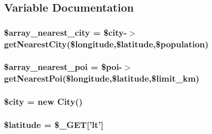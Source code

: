 \subsection{Variable Documentation}
\hypertarget{poi_2nearest_8php_ad20bfb1568497d36431fbd90847417cc}{
\subsubsection[{\$array\-\_\-nearest\-\_\-city}]{\setlength{\rightskip}{0pt plus 5cm}\$array\-\_\-nearest\-\_\-city = \$city-\/$>$get\-Nearest\-City(\$longitude,\$latitude,\$population)}}\label{poi_2nearest_8php_ad20bfb1568497d36431fbd90847417cc}
\hypertarget{poi_2nearest_8php_a0919b64d32b8806e2d59272d197f32e7}{
\subsubsection[{\$array\-\_\-nearest\-\_\-poi}]{\setlength{\rightskip}{0pt plus 5cm}\$array\-\_\-nearest\-\_\-poi = \$poi-\/$>$get\-Nearest\-Poi(\$longitude,\$latitude,\$limit\-\_\-km)}}\label{poi_2nearest_8php_a0919b64d32b8806e2d59272d197f32e7}
\hypertarget{poi_2nearest_8php_a5b9ddd3e3a69d8901270064346bdef49}{
\subsubsection[{\$city}]{\setlength{\rightskip}{0pt plus 5cm}\$city = new {\bf City}()}}\label{poi_2nearest_8php_a5b9ddd3e3a69d8901270064346bdef49}
\hypertarget{poi_2nearest_8php_a5635a7326fb0b96e184ca6f5baa13e94}{
\subsubsection[{\$latitude}]{\setlength{\rightskip}{0pt plus 5cm}\$latitude = \$\-\_\-\-G\-E\-T\mbox{[}'lt'\mbox{]}}}\label{poi_2nearest_8php_a5635a7326fb0b96e184ca6f5baa13e94}


